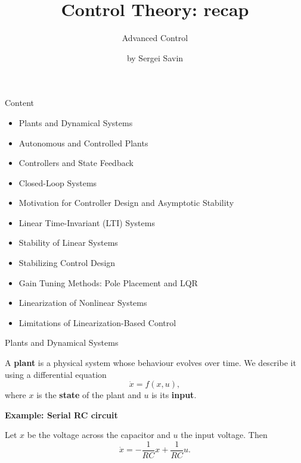 \documentclass{beamer}
\title{Control Theory: recap}
\subtitle{Advanced Control}
\author{by Sergei Savin}
\date{\mydate}
\begin{document}
\maketitle

\begin{frame}{Content}
	\begin{itemize}
		\item Plants and Dynamical Systems
		\item Autonomous and Controlled Plants
		\item Controllers and State Feedback
		\item Closed-Loop Systems
		\item Motivation for Controller Design and Asymptotic Stability
		\item Linear Time-Invariant (LTI) Systems
		\item Stability of Linear Systems
		\item Stabilizing Control Design
		\item Gain Tuning Methods: Pole Placement and LQR
		\item Linearization of Nonlinear Systems
		\item Limitations of Linearization-Based Control
	\end{itemize}
\end{frame}


\begin{frame}{Plants and Dynamical Systems}
	\begin{flushleft}
		
		A \textbf{plant} is a physical system whose behaviour evolves over time.
		We describe it using a differential equation
		\[
		\dot{x}=f(x,u),
		\]
		where \(x\) is the \textbf{state} of the plant and \(u\) is its \textbf{input}.
		
		\bigskip
		
		{
			
		\textbf{Example: Serial RC circuit}
		
		Let \(x\) be the voltage across the capacitor and \(u\) the input voltage.
		Then
		\[
		\dot{x}=-\frac{1}{RC}x+\frac{1}{RC}u.
		\]
	}
	\end{flushleft}
\end{frame}
\end{document}
